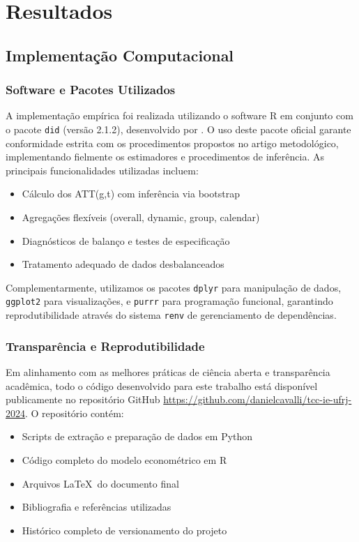 \documentclass[
	12pt,				%
	oneside,			%
	a4paper,			%
	english,			%
	french,				%
	spanish,			%
	brazil				%
	]{abntex2}
\begin{document}
\chapter{Resultados}

\section{Implementação Computacional}

\subsection{Software e Pacotes Utilizados}

A implementação empírica foi realizada utilizando o software R \cite{rcoreteam2024} em conjunto com o pacote \texttt{did} (versão 2.1.2), desenvolvido por . O uso deste pacote oficial garante conformidade estrita com os procedimentos propostos no artigo metodológico, implementando fielmente os estimadores e procedimentos de inferência. As principais funcionalidades utilizadas incluem:

\begin{itemize}
\item Cálculo dos ATT(g,t) com inferência via bootstrap
\item Agregações flexíveis (overall, dynamic, group, calendar)
\item Diagnósticos de balanço e testes de especificação
\item Tratamento adequado de dados desbalanceados
\end{itemize}

Complementarmente, utilizamos os pacotes \texttt{dplyr} para manipulação de dados, \texttt{ggplot2} para visualizações, e \texttt{purrr} para programação funcional, garantindo reprodutibilidade através do sistema \texttt{renv} de gerenciamento de dependências.

\subsection{Transparência e Reprodutibilidade}

Em alinhamento com as melhores práticas de ciência aberta e transparência acadêmica, todo o código desenvolvido para este trabalho está disponível publicamente no repositório GitHub \url{https://github.com/danielcavalli/tcc-ie-ufrj-2024}. O repositório contém:

\begin{itemize}
\item Scripts de extração e preparação de dados em Python
\item Código completo do modelo econométrico em R
\item Arquivos \LaTeX\ do documento final
\item Bibliografia e referências utilizadas
\item Histórico completo de versionamento do projeto
\end{itemize}
\end{document}
